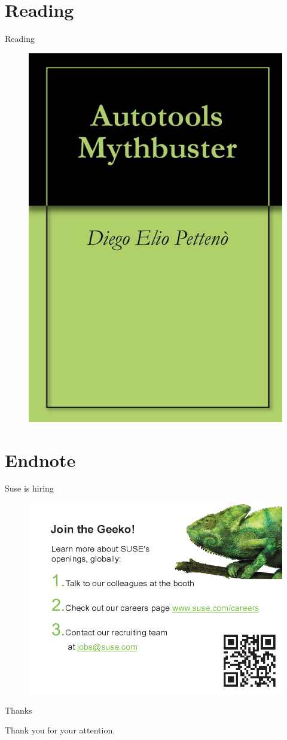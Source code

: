\documentclass{beamer}
\begin{document}
\section{Reading}

\begin{frame}{Reading}
	\begin{figure}
	\includegraphics[width= 0.4\linewidth]{mythbuster.png}
	\end{figure}
\end{frame}

\section{Endnote}

\begin{frame}{Suse is hiring}
	\begin{figure}
	\includegraphics[width= 0.8\linewidth]{suse_hiring.png}
	\end{figure}
\end{frame}

\begin{frame}{Thanks}
	\begin{center}
	Thank you for your attention.
	\end{center}
\end{frame}
\end{document}
